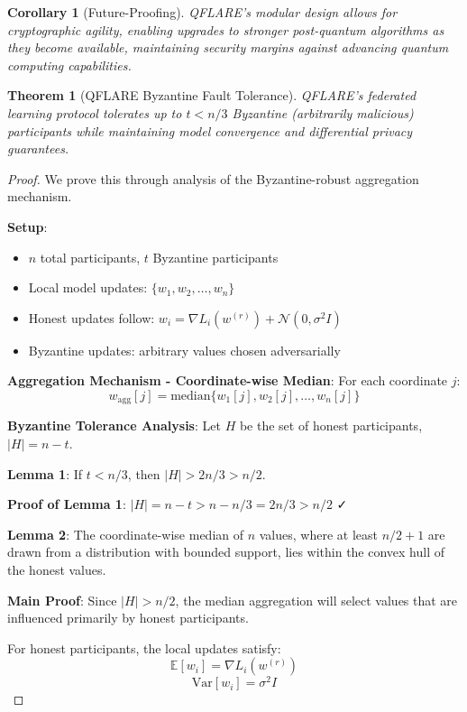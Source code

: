 \documentclass[11pt]{article}
\newtheorem{theorem}{Theorem}
\newtheorem{corollary}{Corollary}
\begin{document}
\begin{corollary}[Future-Proofing]
QFLARE's modular design allows for cryptographic agility, enabling upgrades 
to stronger post-quantum algorithms as they become available, maintaining 
security margins against advancing quantum computing capabilities.
\end{corollary}
        


\begin{theorem}[QFLARE Byzantine Fault Tolerance]
QFLARE's federated learning protocol tolerates up to $t < n/3$ Byzantine 
(arbitrarily malicious) participants while maintaining model convergence 
and differential privacy guarantees.
\end{theorem}

\begin{proof}
We prove this through analysis of the Byzantine-robust aggregation mechanism.

\textbf{Setup}:
\begin{itemize}
\item $n$ total participants, $t$ Byzantine participants
\item Local model updates: $\{w_1, w_2, \ldots, w_n\}$
\item Honest updates follow: $w_i = \nabla L_i(w^{(r)}) + \mathcal{N}(0, \sigma^2 I)$
\item Byzantine updates: arbitrary values chosen adversarially
\end{itemize}

\textbf{Aggregation Mechanism - Coordinate-wise Median}:
For each coordinate $j$:
$$w_{\text{agg}}[j] = \text{median}\{w_1[j], w_2[j], \ldots, w_n[j]\}$$

\textbf{Byzantine Tolerance Analysis}:
Let $H$ be the set of honest participants, $|H| = n - t$.

\textbf{Lemma 1}: If $t < n/3$, then $|H| > 2n/3 > n/2$.

\textbf{Proof of Lemma 1}: 
$|H| = n - t > n - n/3 = 2n/3 > n/2$ ✓

\textbf{Lemma 2}: The coordinate-wise median of $n$ values, where at least $n/2 + 1$ 
are drawn from a distribution with bounded support, lies within the convex hull 
of the honest values.

\textbf{Main Proof}:
Since $|H| > n/2$, the median aggregation will select values that are 
influenced primarily by honest participants.

For honest participants, the local updates satisfy:
$$\mathbb{E}[w_i] = \nabla L_i(w^{(r)})$$
$$\text{Var}[w_i] = \sigma^2 I$$


\end{proof}
\end{document}
